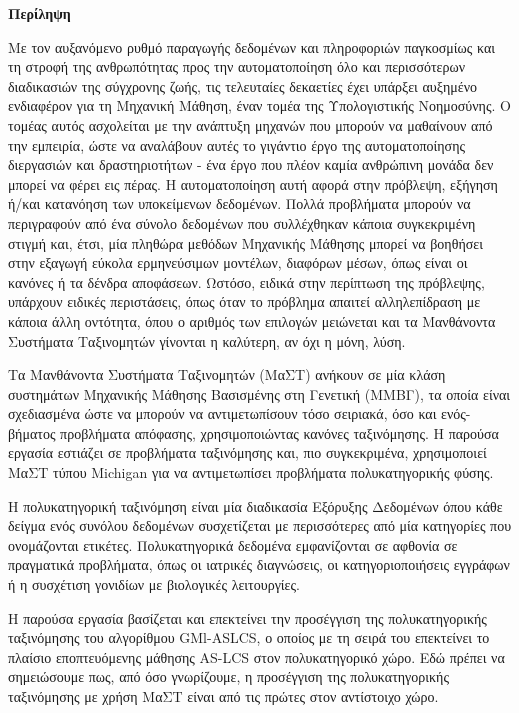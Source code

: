 \begin{center}
\centering

\vspace{0.5cm}
\centering
\textbf{\Large{Περίληψη}}

\vspace{1cm}

\end{center}
Με τον αυξανόμενο ρυθμό παραγωγής δεδομένων και πληροφοριών παγκοσμίως και τη στροφή της ανθρωπότητας προς την αυτοματοποίηση όλο και περισσότερων διαδικασιών της σύγχρονης ζωής, τις τελευταίες δεκαετίες έχει υπάρξει αυξημένο ενδιαφέρον για τη Μηχανική Μάθηση, έναν τομέα της Υπολογιστικής Νοημοσύνης. Ο τομέας αυτός ασχολείται με την ανάπτυξη μηχανών που μπορούν να μαθαίνουν από την εμπειρία, ώστε να αναλάβουν αυτές το γιγάντιο έργο της αυτοματοποίησης διεργασιών και δραστηριοτήτων - ένα έργο που πλέον καμία ανθρώπινη μονάδα δεν μπορεί να φέρει εις πέρας. Η αυτοματοποίηση αυτή αφορά στην πρόβλεψη, εξήγηση ή/και κατανόηση των υποκείμενων δεδομένων. Πολλά προβλήματα μπορούν να περιγραφούν από ένα σύνολο δεδομένων που συλλέχθηκαν κάποια συγκεκριμένη στιγμή και, έτσι, μία πληθώρα μεθόδων Μηχανικής Μάθησης μπορεί να βοηθήσει στην εξαγωγή εύκολα ερμηνεύσιμων μοντέλων, διαφόρων μέσων, όπως είναι οι κανόνες ή τα δένδρα αποφάσεων. Ωστόσο, ειδικά στην περίπτωση της πρόβλεψης, υπάρχουν ειδικές περιστάσεις, όπως όταν το πρόβλημα απαιτεί αλληλεπίδραση με κάποια άλλη οντότητα, όπου ο αριθμός των επιλογών μειώνεται και τα Μανθάνοντα Συστήματα Ταξινομητών γίνονται η καλύτερη, αν όχι η μόνη, λύση.

Τα Μανθάνοντα Συστήματα Ταξινομητών (ΜαΣΤ) ανήκουν σε μία κλάση συστημάτων Μηχανικής Μάθησης Βασισμένης στη Γενετική (ΜΜΒΓ), τα οποία είναι σχεδιασμένα ώστε να μπορούν να αντιμετωπίσουν τόσο σειριακά, όσο και ενός-βήματος προβλήματα απόφασης, χρησιμοποιώντας κανόνες ταξινόμησης. Η παρούσα εργασία εστιάζει σε προβλήματα ταξινόμησης και, πιο συγκεκριμένα, χρησιμοποιεί ΜαΣΤ τύπου Michigan για να αντιμετωπίσει προβλήματα πολυκατηγορικής φύσης.

Η πολυκατηγορική ταξινόμηση είναι μία διαδικασία Εξόρυξης Δεδομένων όπου κάθε δείγμα ενός συνόλου δεδομένων συσχετίζεται με περισσότερες από μία κατηγορίες που ονομάζονται ετικέτες. Πολυκατηγορικά δεδομένα εμφανίζονται σε αφθονία σε πραγματικά προβλήματα, όπως οι ιατρικές διαγνώσεις, οι κατηγοριοποιήσεις εγγράφων ή η συσχέτιση γονιδίων με βιολογικές λειτουργίες.

Η παρούσα εργασία βασίζεται και επεκτείνει την προσέγγιση της πολυκατηγορικής ταξινόμησης του αλγορίθμου GMl-ASLCS, ο οποίος με τη σειρά του επεκτείνει το πλαίσιο εποπτευόμενης μάθησης AS-LCS στον πολυκατηγορικό χώρο. Εδώ πρέπει να σημειώσουμε πως, από όσο γνωρίζουμε, η προσέγγιση της πολυκατηγορικής ταξινόμησης με χρήση ΜαΣΤ είναι από τις πρώτες στον αντίστοιχο χώρο.


